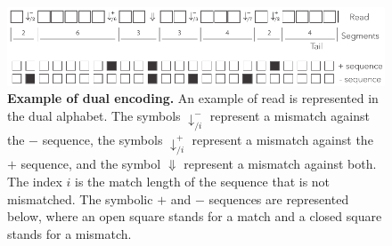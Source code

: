 \documentclass{article}
\begin{document}
\begin{figure}[h]
\centering
\includegraphics[scale=0.85]{sketch_dual.pdf}
\caption{\textbf{Example of dual encoding.}
An example of read is represented in the dual alphabet. The symbols
$\downarrow_{/i}^-$ represent a mismatch against the $-$ sequence, the
symbols $\downarrow_{/i}^+$ represent a mismatch against the $+$ sequence,
and the symbol $\Downarrow$ represent a mismatch against both. The index
$i$ is the match length of the sequence that is not mismatched. The
symbolic $+$ and $-$ sequences are represented below, where an open square
stands for a match and a closed square stands for a mismatch.}
\label{fig:dual}
\end{figure}
\end{document}

